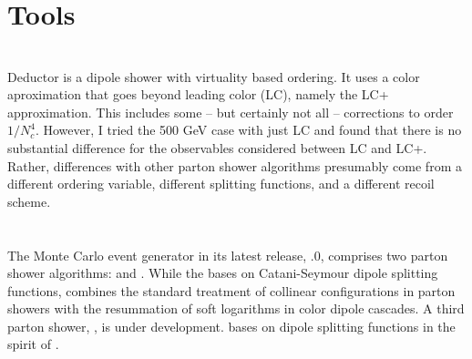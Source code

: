 \section{Tools}
\label{sec:psunc:tools}

\section{\Deductor}
\label{sec:psunc:tools:decuctor}

Deductor is a dipole shower with virtuality based ordering. It uses a color
aproximation that goes beyond leading color (LC), namely the LC+
approximation. This includes some -- but certainly not all -- corrections to
order $1/N_c^4$. However, I tried the 500 GeV case with just LC and found that
there is no substantial difference for the observables considered between LC
and LC+. Rather, differences with other parton shower algorithms presumably
come from a different ordering variable, different splitting functions, and a
different recoil scheme.

\section{\Herwig}
\label{sec:psunc:tools:herwig}

\section{\Pythia}
\label{sec:psunc:tools:pythia}

\section{\Sherpa}
\label{sec:psunc:tools:sherpa}

The \Sherpa Monte Carlo event generator \cite{Gleisberg:2008ta} in its latest
release, .0, comprises two parton shower algorithms: \CSS
\cite{Schumann:2007mg} and \Dire \cite{Hoche:2015sya}. While the \CSS bases on
Catani-Seymour \cite{Catani:1996vz,Catani:2002hc} dipole splitting functions,
\Dire combines the standard treatment of collinear configurations in parton
showers with the resummation of soft logarithms in color dipole cascades. A
third parton shower, \Ants \cite{ants}, is under development. \Ants bases on
dipole splitting functions in the spirit of
\cite{Winter:2007ye,Lonnblad:1992tz}.

